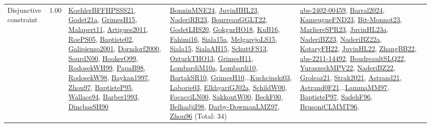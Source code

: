 {\begin{longtable}{p{3cm}r>{\raggedright\arraybackslash}p{6cm}>{\raggedright\arraybackslash}p{6cm}>{\raggedright\arraybackslash}p{8cm}}
\index{Disjunctive constraint}\index{Constraints!Disjunctive constraint}Disjunctive constraint &  1.00 & \hyperref[detail:KoehlerBFFHPSSS21]{KoehlerBFFHPSSS21}, \hyperref[detail:Godet21a]{Godet21a}, \hyperref[detail:GrimesH15]{GrimesH15}, \hyperref[detail:Malapert11]{Malapert11}, \hyperref[detail:Artigues2011]{Artigues2011}, \hyperref[detail:RoePS05]{RoePS05}, \hyperref[detail:Baptiste02]{Baptiste02}, \hyperref[detail:Galipienso2001]{Galipienso2001}, \hyperref[detail:Dorndorf2000]{Dorndorf2000}, \hyperref[detail:SourdN00]{SourdN00}, \hyperref[detail:HookerO99]{HookerO99}, \hyperref[detail:RodosekWH99]{RodosekWH99}, \hyperref[detail:PapaB98]{PapaB98}, \hyperref[detail:RodosekW98]{RodosekW98}, \hyperref[detail:Baykan1997]{Baykan1997}, \hyperref[detail:Zhou97]{Zhou97}, \hyperref[detail:BaptisteP95]{BaptisteP95}, \hyperref[detail:Wallace94]{Wallace94}, \hyperref[detail:Barber1993]{Barber1993}, \hyperref[detail:DincbasSH90]{DincbasSH90} & \hyperref[detail:BonninMNE24]{BonninMNE24}, \hyperref[detail:JuvinHHL23]{JuvinHHL23}, \hyperref[detail:NaderiRR23]{NaderiRR23}, \hyperref[detail:BourreauGGLT22]{BourreauGGLT22}, \hyperref[detail:GodetLHS20]{GodetLHS20}, \hyperref[detail:GokgurHO18]{GokgurHO18}, \hyperref[detail:KuB16]{KuB16}, \hyperref[detail:Fahimi16]{Fahimi16}, \hyperref[detail:Siala15a]{Siala15a}, \hyperref[detail:MelgarejoLS15]{MelgarejoLS15}, \hyperref[detail:Siala15]{Siala15}, \hyperref[detail:SialaAH15]{SialaAH15}, \hyperref[detail:SchuttFS13]{SchuttFS13}, \hyperref[detail:OzturkTHO13]{OzturkTHO13}, \hyperref[detail:GrimesH11]{GrimesH11}, \hyperref[detail:LombardiM10a]{LombardiM10a}, \hyperref[detail:Lombardi10]{Lombardi10}, \hyperref[detail:BartakSR10]{BartakSR10}, \hyperref[detail:GrimesH10]{GrimesH10}...\hyperref[detail:Kuchcinski03]{Kuchcinski03}, \hyperref[detail:Laborie03]{Laborie03}, \hyperref[detail:ElkhyariGJ02a]{ElkhyariGJ02a}, \hyperref[detail:SchildW00]{SchildW00}, \hyperref[detail:FocacciLN00]{FocacciLN00}, \hyperref[detail:SakkoutW00]{SakkoutW00}, \hyperref[detail:BeckF00]{BeckF00}, \hyperref[detail:BelhadjiI98]{BelhadjiI98}, \hyperref[detail:Darby-DowmanLMZ97]{Darby-DowmanLMZ97}, \hyperref[detail:Zhou96]{Zhou96} (Total: 34) & \hyperref[detail:abs-2402-00459]{abs-2402-00459}, \hyperref[detail:Barral2024]{Barral2024}, \hyperref[detail:KameugneFND23]{KameugneFND23}, \hyperref[detail:Bit-Monnot23]{Bit-Monnot23}, \hyperref[detail:MarliereSPR23]{MarliereSPR23}, \hyperref[detail:JuvinHL23a]{JuvinHL23a}, \hyperref[detail:NaderiBZ23]{NaderiBZ23}, \hyperref[detail:NaderiBZ22a]{NaderiBZ22a}, \hyperref[detail:KotaryFH22]{KotaryFH22}, \hyperref[detail:JuvinHL22]{JuvinHL22}, \hyperref[detail:ZhangBB22]{ZhangBB22}, \hyperref[detail:abs-2211-14492]{abs-2211-14492}, \hyperref[detail:BoudreaultSLQ22]{BoudreaultSLQ22}, \hyperref[detail:YuraszeckMPV22]{YuraszeckMPV22}, \hyperref[detail:NaderiBZ22]{NaderiBZ22}, \hyperref[detail:Groleaz21]{Groleaz21}, \hyperref[detail:Strak2021]{Strak2021}, \hyperref[detail:Astrand21]{Astrand21}, \hyperref[detail:Astrand0F21]{Astrand0F21}...\hyperref[detail:LammaMM97]{LammaMM97}, \hyperref[detail:BaptisteP97]{BaptisteP97}, \hyperref[detail:SadehF96]{SadehF96}, \hyperref[detail:BrusoniCLMMT96]{BrusoniCLMMT96}, 
\end{longtable}}
